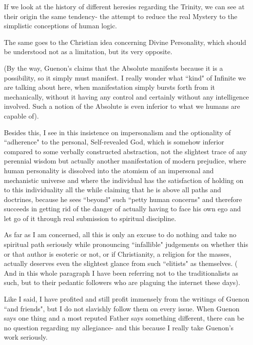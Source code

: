 \begin{footnotesize}
\begin{sffamily}
If we look at the history of different heresies regarding the Trinity, we can see at their origin the same tendency- the attempt to reduce the real Mystery to the simplistic conceptions of human logic.

The same goes to the Christian idea concerning Divine Personality, which should be understood not as a limitation, but its very opposite.

(By the way, Guenon's claims that the Absolute manifests because it is a possibility, so it simply must manifest. I really wonder what ``kind" of Infinite we are talking about here, when manifestation simply bursts forth from it mechanically, without it having any control and certainly without any intelligence involved. Such a notion of the Absolute is even inferior to what we humans are capable of). 

Besides this, I see in this insistence on impersonalism and the optionality of ``adherence" to the personal, Self-revealed God, which is somehow inferior compared to some verbally constructed abstraction, not the slightest trace of any perennial wisdom but actually another manifestation of modern prejudice, where human personality is dissolved into the atomism of an impersonal and mechanistic universe and where the individual has the satisfaction of holding on to this individuality all the while claiming that he is above all paths and doctrines, because he sees ``beyond" such ``petty human concerns" and therefore succeeds in getting rid of the danger of actually having to face his own ego and let go of it through real submission to spiritual discipline.

As far as I am concerned, all this is only an excuse to do nothing and take no spiritual path seriously while pronouncing ``infallible" judgements on whether this or that author is esoteric or not, or if Christianity, a religion for the masses, actually deserves even the slightest glance from such ``elitists" as themselves. ( And in this whole paragraph I have been referring not to the traditionalists as such, but to their pedantic followers who are plaguing the internet these days).

Like I said, I have profited and still profit immensely from the writings of Guenon ``and friends", but I do not slavishly follow them on every issue. When Guenon says one thing and a most reputed Father says something different, there can be no question regarding my allegiance- and this because I really take Guenon's work seriously.


\hfill


\end{sffamily}
\end{footnotesize}
